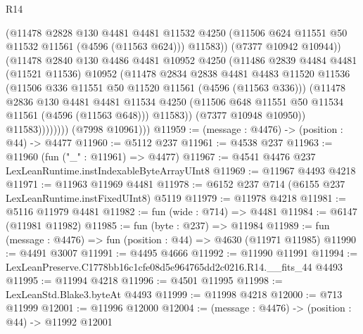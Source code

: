\begin{lexlean}{R14}
\begin{coremodule}
                          (@11478
                            @2828
                            @130
                            @4481
                            @4481
                            @11532
                            @4250
                            (@11506 @624 @11551 @50 @11532 @11561 (@4596 (@11563 @624)))
                            @11583))
                        (@7377 @10942 @10944))
                      (@11478
                        @2840
                        @130
                        @4486
                        @4481
                        @10952
                        @4250
                        (@11486
                          @2839
                          @4484
                          @4481
                          (@11521 @11536)
                          @10952
                          (@11478
                            @2834
                            @2838
                            @4481
                            @4483
                            @11520
                            @11536
                            (@11506 @336 @11551 @50 @11520 @11561 (@4596 (@11563 @336)))
                            (@11478
                              @2836
                              @130
                              @4481
                              @4481
                              @11534
                              @4250
                              (@11506 @648 @11551 @50 @11534 @11561 (@4596 (@11563 @648)))
                              @11583))
                          (@7377 @10948 @10950))
                        @11583))))))))
        (@7998 @10961)))
@11959 := (message : @4476) -> (position : @44) -> @4477
@11960 := @5112 @237
@11961 := @4538 @237
@11963 := @11960 (fun ("_" : @11961) => @4477)
@11967 := @4541 @4476 @237 LexLeanRuntime.instIndexableByteArrayUInt8
@11969 := @11967 @4493 @4218
@11971 := @11963 @11969 @4481
@11978 := @6152 @237 @714 (@6155 @237 LexLeanRuntime.instFixedUInt8) @5119
@11979 := @11978 @4218
@11981 := @5116 @11979 @4481
@11982 := fun (wide : @714) => @4481
@11984 := @6147 (@11981 @11982)
@11985 := fun (byte : @237) => @11984
@11989 := fun (message : @4476) => fun (position : @44) => @4630 (@11971 @11985)
@11990 := @4491 @3007
@11991 := @4495 @4666
@11992 := @11990 @11991
@11994 := LexLeanPreserve.C1778bb16c1cfe08d5e964765dd2c0216.R14.__fits_44 @4493
@11995 := @11994 @4218
@11996 := @4501 @11995
@11998 := LexLeanStd.Blake3.byteAt @4493
@11999 := @11998 @4218
@12000 := @713 @11999
@12001 := @11996 @12000
@12004 := (message : @4476) -> (position : @44) -> @11992 @12001

\end{coremodule}
\end{lexlean}
